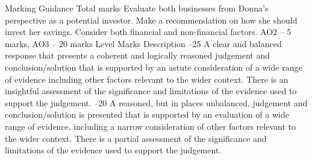 \documentclass{article}
\begin{document}
Marking Guidance \newline
Total \newline
marks  \newline
 \newline
Evaluate both businesses from Donna’s perspective as a potential investor.  \newline
Make a recommendation on how she should invest her savings. \newline
 \newline
Consider both financial and non-financial factors.  \newline
 \newline
AO2 – 5 marks, AO3 – 20 marks \newline
 \newline
Level \newline
Marks \newline
Description  –25 \newline
A clear and balanced response that presents a coherent and logically reasoned \newline
judgement and conclusion/solution that is supported by an astute consideration of a \newline
wide range of evidence including other factors relevant to the wider context.  \newline
 \newline
There is an insightful assessment of the significance and limitations of the evidence \newline
used to support the judgement.  –20 \newline
A reasoned, but in places unbalanced, judgement and conclusion/solution is \newline
presented that is supported by an evaluation of a wide range of evidence, including a \newline
narrow consideration of other factors relevant to the wider context.  \newline
 \newline
There is a partial assessment of the significance and limitations of the evidence used \newline
to support the judgement.  \newline
\end{document}
